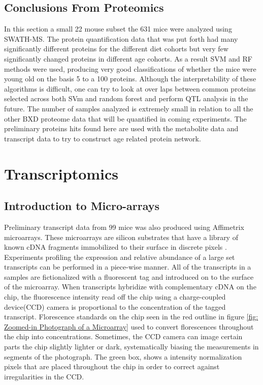 \documentclass[a4paper,11pt,twoside]{book}
\begin{document}
	
	\section{Conclusions From Proteomics}
	
	In this section a small 22 mouse subset the 631 mice were analyzed using SWATH-MS. The protein quantification data that was put forth had many significantly different proteins for the different diet cohorts but very few significantly changed proteins in different age cohorts. As a result SVM and RF methods were used, producing very good classifications of whether the mice were young old on the basis 5 to a 100 proteins. Although the interpretability of these algorithms is difficult, one can try to look at over laps between common proteins selected across both SVm and random forest and perform QTL analysis in the future. The number of samples analyzed is extremely small in relation to all the other BXD proteome data that will be quantified in coming experiments. The preliminary proteins hits found here are used with the metabolite data and transcript data to try to construct age related protein network.
	
	\chapter{Transcriptomics}
	
	\section{Introduction to Micro-arrays}
	
	Preliminary transcript data from 99 mice was also produced using Affimetrix microarrays. These microarrays are silicon substrates that have a library of known cDNA fragments immobilized to their surface in discrete pixels \citep{Miller2009MicroArrays}.  Experiments profiling the expression and relative abundance of a large set transcripts can be performed in a piece-wise manner. All of the transcripts in a samples are fictionalized with a fluorescent tag and introduced on to the surface of the microarray. When transcripts hybridize with complementary cDNA on the chip, the fluorescence intensity read off the chip using a charge-coupled device(CCD) camera is proportional to the concentration of the tagged transcript. Florescence standards on the chip seen in the red outline in figure \ref{fig: Zoomed-in Photograph of a Microarray} used to convert florescences throughout the chip into concentrations. Sometimes, the CCD camera can image certain parts the chip slightly lighter or dark, systematically biasing the measurements in segments of the photograph. The green box, shows a intensity normalization pixels that are placed throughout the chip in order to correct against irregularities in the CCD.
	
\end{document}
